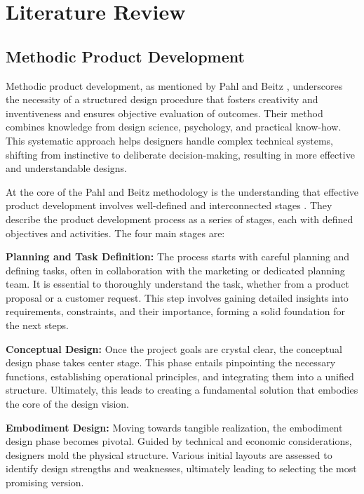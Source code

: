 \chapter{Literature Review}
\label{ch:literaturereview}

\section{Methodic Product Development}
\label{sec:methodicproductdevelopment}

Methodic product development, as mentioned by Pahl and Beitz \cite{Pahl07j}, underscores the necessity of a structured design procedure that fosters creativity and inventiveness and ensures objective evaluation of outcomes. Their method combines knowledge from design science, psychology, and practical know-how. This systematic approach helps designers handle complex technical systems, shifting from instinctive to deliberate decision-making, resulting in more effective and understandable designs.

At the core of the Pahl and Beitz methodology is the understanding that effective product development involves well-defined and interconnected stages \cite{Pahl07k}. They describe the product development process as a series of stages, each with defined objectives and activities. The four main stages are:

\textbf{Planning and Task Definition:} The process starts with careful planning and defining tasks, often in collaboration with the marketing or dedicated planning team. It is essential to thoroughly understand the task, whether from a product proposal or a customer request. This step involves gaining detailed insights into requirements, constraints, and their importance, forming a solid foundation for the next steps.

\textbf{Conceptual Design:} Once the project goals are crystal clear, the conceptual design phase takes center stage. This phase entails pinpointing the necessary functions, establishing operational principles, and integrating them into a unified structure. Ultimately, this leads to creating a fundamental solution that embodies the core of the design vision.

\textbf{Embodiment Design:} Moving towards tangible realization, the embodiment design phase becomes pivotal. Guided by technical and economic considerations, designers mold the physical structure. Various initial layouts are assessed to identify design strengths and weaknesses, ultimately leading to selecting the most promising version.

